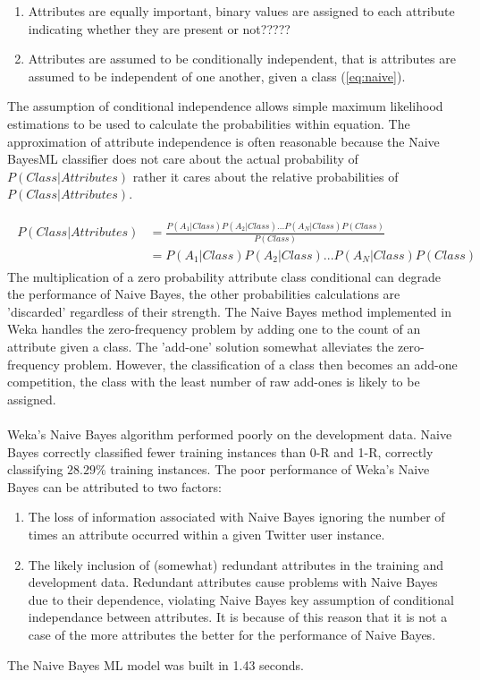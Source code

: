 \documentclass[11pt]{article}
\begin{document}
\begin{enumerate}
\item Attributes are equally important, binary values are assigned to each attribute indicating whether they are present or not?????
\item Attributes are assumed to be conditionally independent, that is attributes are assumed to be independent of one another, given a class (\ref{eq:naive}).
\end{enumerate}   
The assumption of conditional independence allows simple maximum likelihood estimations to be used to calculate the probabilities within equation. The approximation of attribute independence is often reasonable because the Naive BayesML classifier does not care about the actual probability of $P(Class|Attributes)$ rather it cares about the relative probabilities of $P(Class|Attributes)$.

\begin{gather*}\tag{2}\label{eq:naive}
\begin{split}
P(Class|Attributes) &= \frac{P(A_1|Class)P(A_2|Class)...P(A_N|Class)P(Class)}{P(Class)}\\
&= P(A_1|Class)P(A_2|Class)...P(A_N|Class)P(Class)
\end{split}
\end{gather*}
The multiplication of a zero probability attribute class conditional can degrade the performance of Naive Bayes, the other probabilities calculations are 'discarded' regardless of their strength. The Naive Bayes method implemented in Weka handles the zero-frequency problem by adding one to the count of an attribute given a class. The 'add-one' solution somewhat alleviates the zero-frequency problem. However, the classification of a class then becomes an add-one competition, the class with the least number of raw add-ones is likely to be assigned.\\\\
Weka's Naive Bayes algorithm performed poorly on the development data. Naive Bayes correctly classified fewer training instances than 0-R and 1-R, correctly classifying $28.29\%$ training instances. The poor performance of Weka's Naive Bayes can be attributed to two factors:

\begin{enumerate}
\item The loss of information associated with Naive Bayes ignoring the number of times an attribute occurred within a given Twitter user instance.
\item The likely inclusion of (somewhat) redundant attributes in the training and development data. Redundant attributes cause problems with Naive Bayes due to their dependence, violating Naive Bayes key assumption of conditional independance between attributes. It is because of this reason that it is not a case of the more attributes the better for the performance of Naive Bayes.
\end{enumerate}
The Naive Bayes ML model was built in 1.43 seconds. 
\end{document}
